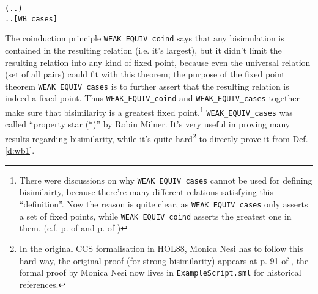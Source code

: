 \begin{enumerate}
\begin{small}
\begin{alltt}
       (\HOLSymConst{\HOLTokenForall{}}.  \HOLTokenTransBegin\HOLSymConst{\ensuremath{\tau}}\HOLTokenTransEnd {} \HOLSymConst{\HOLTokenImp{}} \HOLSymConst{\HOLTokenExists{}}.  \HOLSymConst{\HOLTokenEPS}  \HOLSymConst{\HOLTokenConj{}}  \HOLSymConst{\HOLTokenWeakEQ} ) \HOLSymConst{\HOLTokenConj{}}
       \HOLSymConst{\HOLTokenForall{}}.  \HOLTokenTransBegin\HOLSymConst{\ensuremath{\tau}}\HOLTokenTransEnd {} \HOLSymConst{\HOLTokenImp{}} \HOLSymConst{\HOLTokenExists{}}.  \HOLSymConst{\HOLTokenEPS}  \HOLSymConst{\HOLTokenConj{}}  \HOLSymConst{\HOLTokenWeakEQ} \hfill{[WB_cases]}
\end{alltt}
\end{small}
\end{enumerate}

The coinduction principle \texttt{WEAK_EQUIV_coind} says that any
bisimulation is contained in the resulting relation (i.e. it's
largest), but it didn't limit the resulting relation into any kind of
fixed point, because even the universal relation (set of all pairs)
could fit with this theorem; the
purpose of the fixed point theorem \texttt{WEAK_EQUIV_cases} is to
further assert that the resulting relation is indeed a
fixed point. Thus \texttt{WEAK_EQUIV_coind} and \texttt{WEAK_EQUIV_cases}
together make sure that bisimilarity is a greatest
fixed point.\footnote{There were discussions on why
  \texttt{WEAK_EQUIV_cases} cannot be used for defining
  bisimilairty, because there're many different relations satisfying
  this ``definition''.
Now the reason is quite clear, as \texttt{WEAK_EQUIV_cases} only
asserts a set of fixed points, while \texttt{WEAK_EQUIV_coind}
  asserts the greatest one in them. (c.f. p. of \cite{Gorrieri:2015jt} and p. of \cite{Mil89})}
\texttt{WEAK_EQUIV_cases} was called ``property star (*)'' by Robin
Milner. It's very useful in proving
many results regarding bisimilarity, while it's quite hard\footnote{In
  the original CCS formalisation in HOL88, Monica Nesi has to follow
  this hard way, the original proof (for strong bisimilarity) appears
  at p. 91 of \cite{Mil89}, the formal proof by Monica Nesi now lives
  in \texttt{ExampleScript.sml} for historical references.} to
directly prove it from Def.\;\ref{d:wb1}.
